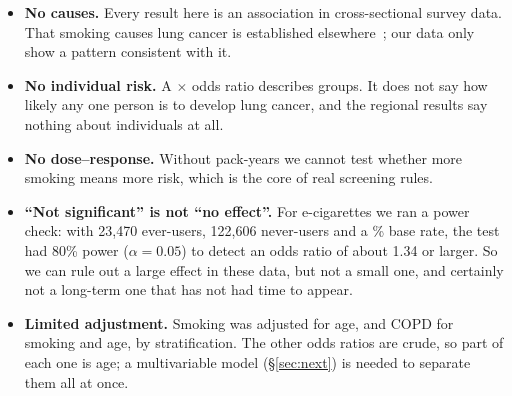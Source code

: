 \begin{itemize}
  \item \textbf{No causes.} Every result here is an association in cross-sectional survey data. That smoking causes lung cancer is established elsewhere~\cite{uspstf,tammemagi}; our data only show a pattern consistent with it.
  \item \textbf{No individual risk.} A \orSmoking\unskip$\times$ odds ratio describes groups. It does not say how likely any one person is to develop lung cancer, and the regional results say nothing about individuals at all.
  \item \textbf{No dose--response.} Without pack-years we cannot test whether more smoking means more risk, which is the core of real screening rules.
  \item \textbf{``Not significant'' is not ``no effect''.} For e-cigarettes we ran a power check: with 23,470 ever-users, 122,606 never-users and a \sampleRate\% base rate, the test had 80\% power ($\alpha = 0.05$) to detect an odds ratio of about 1.34 or larger. So we can rule out a large effect in these data, but not a small one, and certainly not a long-term one that has not had time to appear.
  \item \textbf{Limited adjustment.} Smoking was adjusted for age, and COPD for smoking and age, by stratification. The other odds ratios are crude, so part of each one is age; a multivariable model (\S\ref{sec:next}) is needed to separate them all at once.
\end{itemize}
